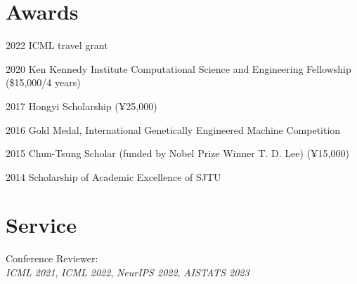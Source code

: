 \documentclass[12pt,letterpaper]{report}
\newcommand{\listitemspace}{0.05em}
\renewenvironment{itemize}
{\begin{list}{}{\setlength{\leftmargin}{0em}
			\setlength{\parskip}{0em}
			\setlength{\itemsep}{\listitemspace}
			\setlength{\parsep}{\listitemspace}}}
	{\end{list}}
\begin{document}
	\section*{Awards}

	\begin{tablist}
		
		\item[2022] \tab ICML travel grant

		\item[2020] \tab Ken Kennedy Institute Computational Science and Engineering Fellowship (\$15,000/4 years)
				
		\item[2017] \tab Hongyi Scholarship (¥25,000)
		
		\item[2016] \tab Gold Medal, International Genetically Engineered Machine Competition
		
		\item[2015] \tab Chun-Tsung Scholar (funded by Nobel Prize Winner T. D. Lee) (¥15,000)
		
		\item[2014] \tab Scholarship of Academic Excellence of SJTU

	\end{tablist}	

	\section*{Service}
    \begin{itemize}
        \item Conference Reviewer: 
		\\ \textit{ICML 2021}, \textit{ICML 2022}, \textit{NeurIPS 2022}, \textit{AISTATS 2023}
    \end{itemize}
\end{document}
